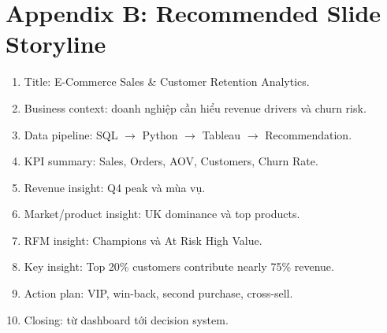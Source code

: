\documentclass[11pt,a4paper]{article}
\begin{document}
\section{Appendix B: Recommended Slide Storyline}

\begin{enumerate}
    \item Title: E-Commerce Sales \& Customer Retention Analytics.
    \item Business context: doanh nghiệp cần hiểu revenue drivers và churn risk.
    \item Data pipeline: SQL $\rightarrow$ Python $\rightarrow$ Tableau $\rightarrow$ Recommendation.
    \item KPI summary: Sales, Orders, AOV, Customers, Churn Rate.
    \item Revenue insight: Q4 peak và mùa vụ.
    \item Market/product insight: UK dominance và top products.
    \item RFM insight: Champions và At Risk High Value.
    \item Key insight: Top 20\% customers contribute nearly 75\% revenue.
    \item Action plan: VIP, win-back, second purchase, cross-sell.
    \item Closing: từ dashboard tới decision system.
\end{enumerate}
\end{document}
